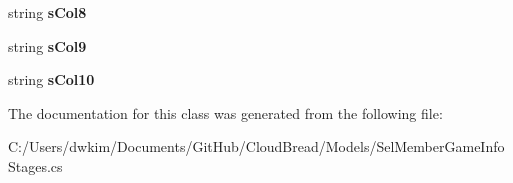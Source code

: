 \begin{DoxyCompactItemize}
\item 
string {\bfseries s\+Col8}\hypertarget{a00099_a6465388b2faf1e52c008260b1c465f5b}{}\label{a00099_a6465388b2faf1e52c008260b1c465f5b}

\item 
string {\bfseries s\+Col9}\hypertarget{a00099_aece739818f2aa238d8f96e859fc7d9e8}{}\label{a00099_aece739818f2aa238d8f96e859fc7d9e8}

\item 
string {\bfseries s\+Col10}\hypertarget{a00099_ae1f34a3e35a4db5ab19f9b061d7c1a09}{}\label{a00099_ae1f34a3e35a4db5ab19f9b061d7c1a09}

\end{DoxyCompactItemize}


The documentation for this class was generated from the following file\+:\begin{DoxyCompactItemize}
\item 
C\+:/\+Users/dwkim/\+Documents/\+Git\+Hub/\+Cloud\+Bread/\+Models/Sel\+Member\+Game\+Info\+Stages.\+cs\end{DoxyCompactItemize}
